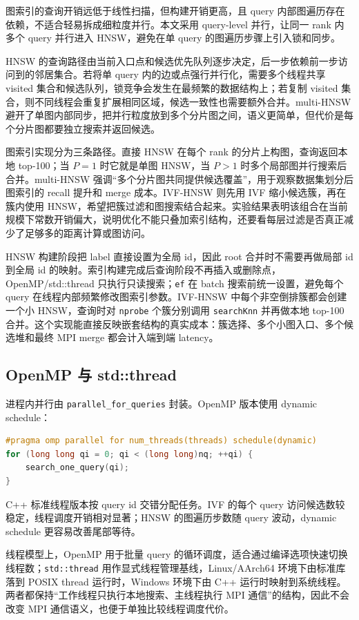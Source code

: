\documentclass[11pt,a4paper]{article}
\begin{document}
图索引的查询开销远低于线性扫描，但构建开销更高，且 query 内部图遍历存在依赖，不适合轻易拆成细粒度并行。本文采用 query-level 并行，让同一 rank 内多个 query 并行进入 HNSW，避免在单 query 的图遍历步骤上引入锁和同步。

HNSW 的查询路径由当前入口点和候选优先队列逐步决定，后一步依赖前一步访问到的邻居集合。若将单 query 内的边或点强行并行化，需要多个线程共享 visited 集合和候选队列，锁竞争会发生在最频繁的数据结构上；若复制 visited 集合，则不同线程会重复扩展相同区域，候选一致性也需要额外合并。multi-HNSW 避开了单图内部同步，把并行粒度放到多个分片图之间，语义更简单，但代价是每个分片图都要独立搜索并返回候选。

图索引实现分为三条路径。直接 HNSW 在每个 rank 的分片上构图，查询返回本地 top-100；当 $P=1$ 时它就是单图 HNSW，当 $P>1$ 时多个局部图并行搜索后合并。multi-HNSW 强调“多个分片图共同提供候选覆盖”，用于观察数据集划分后图索引的 recall 提升和 merge 成本。IVF-HNSW 则先用 IVF 缩小候选簇，再在簇内使用 HNSW，希望把簇过滤和图搜索结合起来。实验结果表明该组合在当前规模下常数开销偏大，说明优化不能只叠加索引结构，还要看每层过滤是否真正减少了足够多的距离计算或图访问。

HNSW 构建阶段把 label 直接设置为全局 id，因此 root 合并时不需要再做局部 id 到全局 id 的映射。索引构建完成后查询阶段不再插入或删除点，OpenMP/std::thread 只执行只读搜索；\texttt{ef} 在 batch 搜索前统一设置，避免每个 query 在线程内部频繁修改图索引参数。IVF-HNSW 中每个非空倒排簇都会创建一个小 HNSW，查询时对 \texttt{nprobe} 个簇分别调用 \texttt{searchKnn} 并再做本地 top-100 合并。这个实现能直接反映嵌套结构的真实成本：簇选择、多个小图入口、多个候选堆和最终 MPI merge 都会计入端到端 latency。

\subsection{OpenMP 与 std::thread}

进程内并行由 \texttt{parallel\_for\_queries} 封装。OpenMP 版本使用 dynamic schedule：
\begin{lstlisting}[language=C++]
#pragma omp parallel for num_threads(threads) schedule(dynamic)
for (long long qi = 0; qi < (long long)nq; ++qi) {
    search_one_query(qi);
}
\end{lstlisting}
C++ 标准线程版本按 query id 交错分配任务。IVF 的每个 query 访问候选数较稳定，线程调度开销相对显著；HNSW 的图遍历步数随 query 波动，dynamic schedule 更容易改善尾部等待。

线程模型上，OpenMP 用于批量 query 的循环调度，适合通过编译选项快速切换线程数；\texttt{std::thread} 用作显式线程管理基线，Linux/AArch64 环境下由标准库落到 POSIX thread 运行时，Windows 环境下由 C++ 运行时映射到系统线程。两者都保持“工作线程只执行本地搜索、主线程执行 MPI 通信”的结构，因此不会改变 MPI 通信语义，也便于单独比较线程调度代价。
\end{document}
